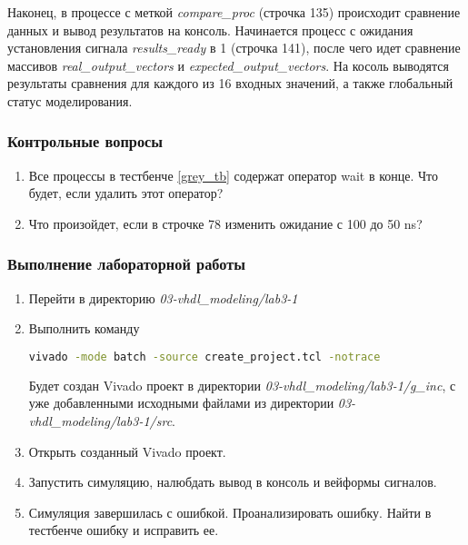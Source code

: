 Наконец, в процессе с меткой \emph{compare\_proc} (строчка 135) происходит сравнение данных и вывод результатов на консоль. Начинается процесс с ожидания установления сигнала \emph{results\_ready} в 1 (строчка 141), после чего идет сравнение массивов \emph{real\_output\_vectors} и \emph{expected\_output\_vectors}. На косоль выводятся результаты сравнения для каждого из 16 входных значений, а также глобальный статус моделирования. 




\subsubsection{Контрольные вопросы} 
\begin{enumerate}
\item Все процессы в тестбенче \ref{grey_tb} содержат оператор wait в конце. Что будет, если удалить этот оператор?
\item Что произойдет, если в строчке 78 изменить ожидание с 100 до 50 ns? 
\end{enumerate}

\subsubsection{Выполнение лабораторной работы} 


\begin{enumerate}
\item Перейти в директорию \emph{03-vhdl\_modeling/lab3-1}
\item Выполнить команду 
\begin{lstlisting}[language = bash]
vivado -mode batch -source create_project.tcl -notrace
\end{lstlisting}
Будет создан Vivado проект в директории \emph{03-vhdl\_modeling/lab3-1/g\_inc}, с уже добавленными исходными файлами из директории \emph{03-vhdl\_modeling/lab3-1/src}.   
\item Открыть созданный Vivado проект.
\item Запустить симуляцию, налюбдать вывод в консоль и вейформы сигналов.
\item Симуляция завершилась с ошибкой. Проанализировать ошибку. Найти в тестбенче ошибку и исправить ее. 
\end{enumerate}